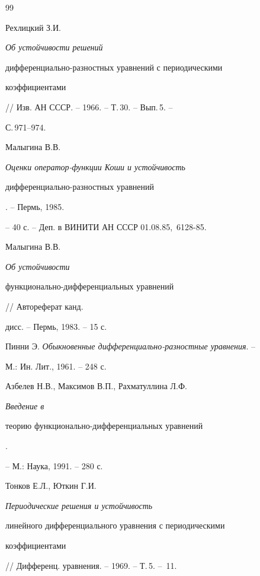 \begin{thebibliography}{99} 


 




Рехлицкий З.И. {\em Об устойчивости решений


дифференциально-разностных уравнений с периодическими


коэффициентами} // Изв. АН СССР. -- 1966. -- Т.\,30. -- Вып.\,5. --


С.\,971--974.







Малыгина В.В. {\em Оценки оператор-функции Коши и устойчивость


диф\-фе\-рен\-ци\-аль\-но-раз\-ност\-ных уравнений}. -- Пермь, 1985.


-- 40 с. -- Деп. в ВИНИТИ АН СССР 01.08.85, \No\,6128-85.







Малыгина В.В. {\em Об устойчивости


функционально-дифференциальных уравнений} // Автореферат канд.


дисс. -- Пермь, 1983. -- 15 с.







Пинни Э. {\em Обыкновенные дифференциально-разностные уравнения}. --


М.: Ин. Лит., 1961. -- 248 с.







Азбелев Н.В., Максимов В.П., Рахматуллина Л.Ф. {\em Введение в


теорию функ\-ци\-о\-наль\-но-диф\-фе\-рен\-ци\-аль\-ных уравнений}.


-- М.: Наука, 1991. -- 280 с.







Тонков Е.Л., Юткин Г.И. {\em Периодические решения и устойчивость


линейного дифференциального уравнения с периодическими


коэффициентами} // Дифференц. уравнения. -- 1969. -- Т.\,5. -- \No\,11.



\end{thebibliography}

